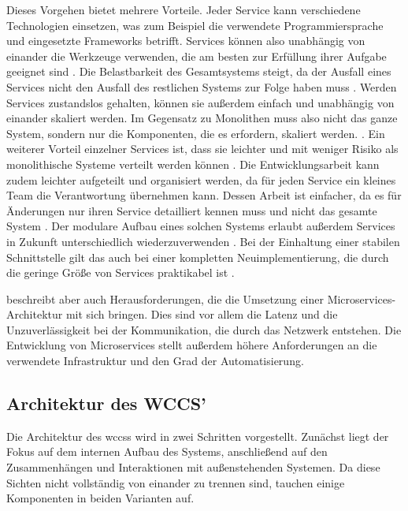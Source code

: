         Dieses Vorgehen bietet mehrere Vorteile.
        Jeder Service kann verschiedene Technologien einsetzen,
        was zum Beispiel die verwendete Programmiersprache und eingesetzte Frameworks betrifft.
        Services können also unabhängig von einander die Werkzeuge verwenden,
        die am besten zur Erfüllung ihrer Aufgabe geeignet sind
        \cite[Kapitel 1.2.1]{newman:microservices}.
        Die Belastbarkeit des Gesamtsystems steigt,
        da der Ausfall eines Services nicht den Ausfall des restlichen Systems
        zur Folge haben muss
        \cite[Kapitel 1.2.2]{newman:microservices}.
        Werden Services zustandslos gehalten,
        können sie außerdem einfach und unabhängig von einander skaliert werden.
        Im Gegensatz zu Monolithen muss also nicht das ganze System,
        sondern nur die Komponenten, die es erfordern, skaliert werden.
        \cite[Kapitel 1.2.3]{newman:microservices}.
        Ein weiterer Vorteil einzelner Services ist,
        dass sie leichter und mit weniger Risiko als monolithische Systeme
        verteilt werden können
        \cite[Kapitel 1.2.4]{newman:microservices}.
        Die Entwicklungsarbeit kann zudem leichter aufgeteilt und organisiert werden,
        da für jeden Service ein kleines Team die Verantwortung übernehmen kann.
        Dessen Arbeit ist einfacher, da es für Änderungen nur ihren Service detailliert kennen muss
        und nicht das gesamte System
        \cite[Kapitel 1.2.5]{newman:microservices}.
        Der modulare Aufbau eines solchen Systems erlaubt außerdem Services
        in Zukunft unterschiedlich wiederzuverwenden
        \cite[Kapitel 1.2.6]{newman:microservices}.
        Bei der Einhaltung einer stabilen Schnittstelle gilt das auch bei einer
        kompletten Neuimplementierung, die durch die geringe Größe von
        Services praktikabel ist
        \cite[Kapitel 1.2.7]{newman:microservices}.       

        \citet[Kapitel 6.1-6.3]{wolff:microservices} beschreibt aber auch
        Herausforderungen, die die Umsetzung einer Microservices-Architektur mit sich bringen.
        Dies sind vor allem die Latenz und die Unzuverlässigkeit bei der Kommunikation,
        die durch das Netzwerk entstehen.
        Die Entwicklung von Microservices stellt außerdem höhere Anforderungen an die
        verwendete Infrastruktur und den Grad der Automatisierung.

    \subsection{Architektur des WCCS'}
        Die Architektur des \glspl{wccs} wird in zwei Schritten vorgestellt.
        Zunächst liegt der Fokus auf dem internen Aufbau des Systems,
        anschließend auf den Zusammenhängen und Interaktionen mit außenstehenden Systemen.
        Da diese Sichten nicht vollständig von einander zu trennen sind,
        tauchen einige Komponenten in beiden Varianten auf.
        

